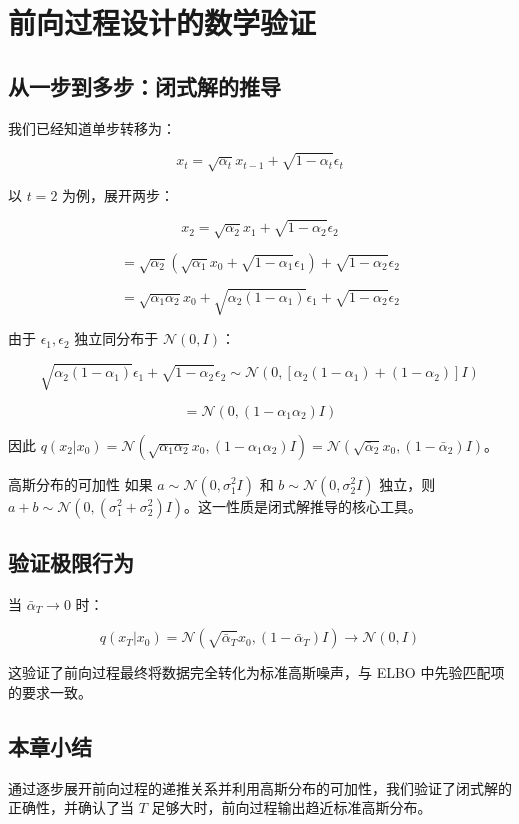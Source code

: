 \section{前向过程设计的数学验证}

\subsection{从一步到多步：闭式解的推导}

我们已经知道单步转移为：

$$x_t = \sqrt{\alpha_t} x_{t-1} + \sqrt{1 - \alpha_t} \epsilon_t$$

以 $t=2$ 为例，展开两步：

$$x_2 = \sqrt{\alpha_2} x_1 + \sqrt{1-\alpha_2} \epsilon_2$$

$$= \sqrt{\alpha_2}(\sqrt{\alpha_1} x_0 + \sqrt{1-\alpha_1} \epsilon_1) + \sqrt{1-\alpha_2} \epsilon_2$$

$$= \sqrt{\alpha_1 \alpha_2} x_0 + \sqrt{\alpha_2(1-\alpha_1)} \epsilon_1 + \sqrt{1-\alpha_2} \epsilon_2$$

由于 $\epsilon_1, \epsilon_2$ 独立同分布于 $\mathcal{N}(0, I)$：

$$\sqrt{\alpha_2(1-\alpha_1)} \epsilon_1 + \sqrt{1-\alpha_2} \epsilon_2 \sim \mathcal{N}(0, [\alpha_2(1-\alpha_1) + (1-\alpha_2)] I)$$

$$= \mathcal{N}(0, (1 - \alpha_1 \alpha_2) I)$$

因此 $q(x_2 | x_0) = \mathcal{N}(\sqrt{\alpha_1 \alpha_2} x_0, (1 - \alpha_1 \alpha_2) I) = \mathcal{N}(\sqrt{\bar{\alpha}_2} x_0, (1-\bar{\alpha}_2) I)$。

\begin{knowledgebox}{高斯分布的可加性}
如果 $a \sim \mathcal{N}(0, \sigma_1^2 I)$ 和 $b \sim \mathcal{N}(0, \sigma_2^2 I)$ 独立，则 $a + b \sim \mathcal{N}(0, (\sigma_1^2 + \sigma_2^2) I)$。这一性质是闭式解推导的核心工具。
\end{knowledgebox}

\subsection{验证极限行为}

当 $\bar{\alpha}_T \to 0$ 时：

$$q(x_T | x_0) = \mathcal{N}(\sqrt{\bar{\alpha}_T} x_0, (1-\bar{\alpha}_T)I) \to \mathcal{N}(0, I)$$

这验证了前向过程最终将数据完全转化为标准高斯噪声，与 ELBO 中先验匹配项的要求一致。

\subsection{本章小结}

通过逐步展开前向过程的递推关系并利用高斯分布的可加性，我们验证了闭式解的正确性，并确认了当 $T$ 足够大时，前向过程输出趋近标准高斯分布。


